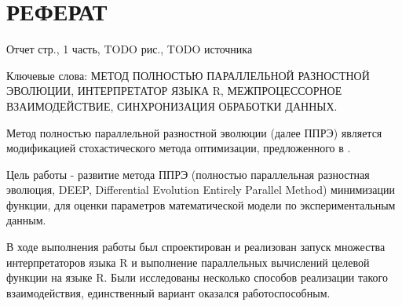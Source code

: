 \chapter*{РЕФЕРАТ}

Отчет \pageref{LastPage} стр., 1 часть, TODO рис., TODO источника

Ключевые слова: МЕТОД ПОЛНОСТЬЮ ПАРАЛЛЕЛЬНОЙ РАЗНОСТНОЙ ЭВОЛЮЦИИ, ИНТЕРПРЕТАТОР ЯЗЫКА R, МЕЖПРОЦЕССОРНОЕ ВЗАИМОДЕЙСТВИЕ, СИНХРОНИЗАЦИЯ ОБРАБОТКИ ДАННЫХ.

Метод полностью параллельной разностной эволюции (далее ППРЭ) \cite{Kozlov11, Kozlov13} является модификацией стохастического метода оптимизации, предложенного в \cite{Storn95}.

Цель работы - развитие метода ППРЭ (полностью параллельная разностная эволюция, DEEP, Differential Evolution Entirely Parallel Method) минимизации функции, для оценки параметров математической модели по экспериментальным данным.

В ходе выполнения работы был спроектирован и реализован запуск множества интерпретаторов языка R и выполнение параллельных вычислений целевой функции на языке R. Были исследованы несколько способов реализации такого взаимодействия, единственный вариант оказался работоспособным.

